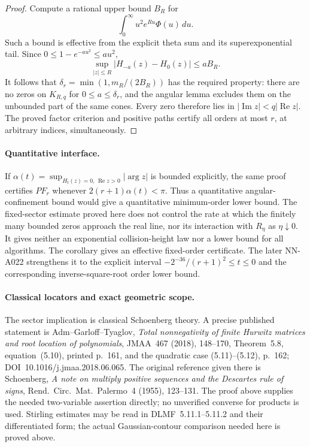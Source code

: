 \begin{proof}
Compute a rational upper bound $B_R$ for
\[
 \int_0^\infty u^2e^{Ru}\Phi(u)\,du.
\]
Such a bound is effective from the explicit theta sum and its
superexponential tail. Since $0\le1-e^{-au^2}\le au^2$,
\[
 \sup_{|z|\le R}|H_{-a}(z)-H_0(z)|\le aB_R.
\]
It follows that
$\delta_r=\min(1,m_R/(2B_R))$ has the required property:
there are no zeros on $K_{R,q}$ for $0\le a\le\delta_r$, and
the angular lemma excludes them on the unbounded part of the
same cones. Every zero therefore lies in
$|\operatorname{Im}z|<q|\operatorname{Re}z|$.
The proved factor criterion and positive paths certify all
orders at most $r$, at arbitrary indices, simultaneously.
\end{proof}

\paragraph{Quantitative interface.}
If
$\alpha(t)=\sup_{H_t(z)=0,\,\operatorname{Re}z>0}|\arg z|$
is bounded explicitly, the same proof certifies $PF_r$ whenever
$2(r+1)\alpha(t)<\pi$. Thus a quantitative angular-confinement
bound would give a quantitative minimum-order lower bound.
The fixed-sector estimate proved here does not control the rate
at which the finitely many bounded zeros approach the real line,
nor its interaction with $R_\eta$ as $\eta\downarrow0$.
It gives neither an exponential collision-height law nor a
lower bound for all algorithms.
The corollary gives an effective fixed-order certificate. The later
NN-A022 strengthens it to the explicit interval
$-2^{-36}/(r+1)^2\le t\le0$ and the corresponding
inverse-square-root order lower bound.

\paragraph{Classical locators and exact geometric scope.}
The sector implication is classical Schoenberg theory. A precise
published statement is Adm--Garloff--Tyaglov, \emph{Total
nonnegativity of finite Hurwitz matrices and root location of
polynomials}, JMAA~467 (2018), 148--170, Theorem~5.8,
equation~(5.10), printed p.~161, and the quadratic case
(5.11)--(5.12), p.~162; DOI~10.1016/j.jmaa.2018.06.065.
The original reference given there is Schoenberg,
\emph{A note on multiply positive sequences and the Descartes
rule of signs}, Rend.\ Circ.\ Mat.\ Palermo~4 (1955), 123--131.
The proof above supplies the needed two-variable assertion
directly; no unverified converse for products is used.
Stirling estimates may be read in DLMF~5.11.1--5.11.2 and
their differentiated form; the actual Gaussian-contour
comparison needed here is proved above.

